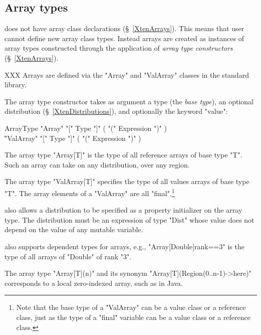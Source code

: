 \subsection{Array types}
\label{ArrayTypeConstructors}

{}\XtenCurrVer{} does not have array class declarations
(\S~\ref{XtenArrays}). This means that user cannot define new array
class types. Instead arrays are created as instances of array types
constructed through the application of {\em array type constructors}
(\S~\ref{XtenArrays}).

XXX 
Arrays are defined via the \xcd"Array" and \xcd"ValArray"
classes in the standard library.

The array type constructor takes as argument a type (the {\em base
type}), an optional distribution (\S~\ref{XtenDistributions}), and
optionally the keyword \xcd"value":
\begin{grammar}
  ArrayType \: \xcd"Array" \xcd"[" Type \xcd"]" ( \xcd"(" Expression \xcd")" )\opt \\
     \| \xcd"ValArray" \xcd"[" Type \xcd"]" ( \xcd"(" Expression \xcd")" )\opt
\end{grammar}

The array type \xcd"Array[T]" is the type of all
reference arrays of base type \xcd"T". Such an array can take on any
distribution, over any region. 

The array type \xcd"ValArray[T]" specifies the type of all
values arrays of base type \xcd"T".
The array elements of a \xcd"ValArray" are
all \xcd"final".\footnote{Note that the base type of a
\xcd"ValArray" can be a value class or a reference class, just as the 
type of a \xcd"final" variable can be a value class or a reference class.}

\XtenCurrVer{} also allows a distribution to be specified 
as a property initializer on the array type.
The distribution must be an expression of type
\xcd"Dist" whose
value does not depend on the value of any mutable variable.

\Xten{} also supports dependent types for arrays,
e.g.,
\xcd"Array[Double]{rank==3}" is the type of all arrays of 
\xcd"Double" of rank \xcd"3".

The array type
\xcd"Array[T](n)" and its synonym
\xcd"Array[T](Region(0..n-1)->here)" corresponds to a local
zero-indexed array, such as in Java.
